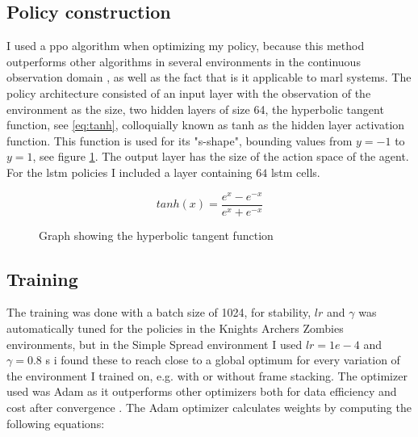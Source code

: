 \documentclass[UKenglish]{uiomasterthesis}
\begin{document}
\subsection{Policy construction}
I used a \ac{ppo} algorithm when optimizing my policy, because this method outperforms other algorithms in several environments in the continuous observation domain \cite{schulman2017proximalpolicyoptimizationalgorithms}, as well as the fact that is it applicable to \ac{marl} systems. The policy architecture consisted of an input layer with the observation of the environment as the size, two hidden layers of size 64, the hyperbolic tangent function, see \ref{eq:tanh}, colloquially known as tanh as the hidden layer activation function. This function is used for its "s-shape", bounding values from $y=-1$ to $y=1$, see figure \ref{fig:tanh}. The output layer has the size of the action space of the agent. For the \ac{lstm} policies I included a layer containing $64$ \ac{lstm} cells.

\begin{equation}
\label{eq:tanh}
tanh(x) = \frac{e^x-e^{-x}}{e^x+e^{-x}}
\end{equation}

\begin{figure}[H]
\centering
{}
\caption{Graph showing the hyperbolic tangent function}
\label{fig:tanh}
\end{figure}

\subsection{Training}
The training was done with a batch size of 1024, for stability, $lr$ and $\gamma$ was automatically tuned for the policies in the Knights Archers Zombies environments, but in the Simple Spread environment I used $lr = 1e-4$ and $\gamma = 0.8$ s i found these to reach close to a global optimum for every variation of the environment I trained on, e.g. with or without frame stacking. The optimizer used was Adam as it outperforms other optimizers both for data efficiency and cost after convergence \cite{adam_optim}. The Adam optimizer calculates weights by computing the following equations:
\end{document}

